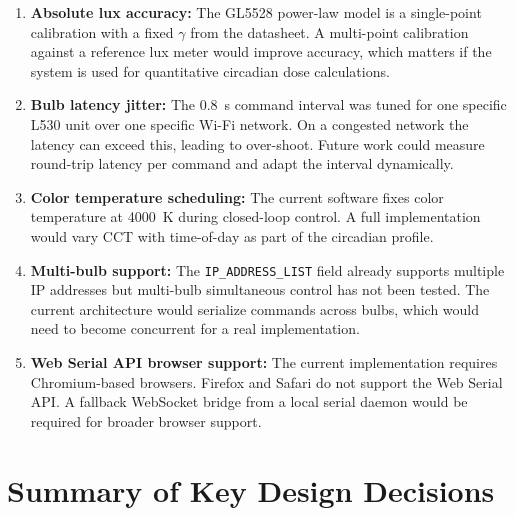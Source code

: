 \documentclass[12pt,letterpaper]{article}
\begin{document}
\begin{enumerate}
  \item \textbf{Absolute lux accuracy:} The GL5528 power-law model is a
        single-point calibration with a fixed $\gamma$ from the datasheet.
        A multi-point calibration against a reference lux meter would improve
        accuracy, which matters if the system is used for quantitative circadian
        dose calculations.

  \item \textbf{Bulb latency jitter:} The 0.8~s command interval was tuned for
        one specific L530 unit over one specific Wi-Fi network. On a congested
        network the latency can exceed this, leading to over-shoot. Future work
        could measure round-trip latency per command and adapt the interval
        dynamically.

  \item \textbf{Color temperature scheduling:} The current software fixes color
        temperature at 4000~K during closed-loop control. A full implementation
        would vary CCT with time-of-day as part of the circadian profile.

  \item \textbf{Multi-bulb support:} The \texttt{IP\_ADDRESS\_LIST} field
        already supports multiple IP addresses but multi-bulb simultaneous
        control has not been tested. The current architecture would serialize
        commands across bulbs, which would need to become concurrent for a
        real implementation.

  \item \textbf{Web Serial API browser support:} The current implementation
        requires Chromium-based browsers. Firefox and Safari do not support
        the Web Serial API. A fallback WebSocket bridge from a local serial
        daemon would be required for broader browser support.
\end{enumerate}

\section{Summary of Key Design Decisions}
\end{document}
